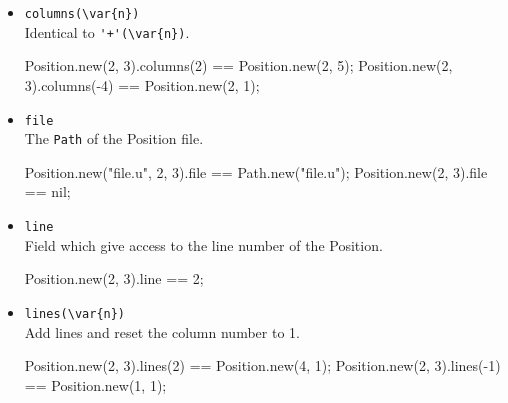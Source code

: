 \begin{itemize}
\item \lstinline|columns(\var{n})|\\
  Identical to \lstinline|'+'(\var{n})|.
\begin{urbiassert}[firstnumber=last]
Position.new(2, 3).columns(2) == Position.new(2, 5);
Position.new(2, 3).columns(-4) == Position.new(2, 1);
\end{urbiassert}

\item \lstinline|file|\\
  The \lstinline|Path| of the Position file.
\begin{urbiassert}[firstnumber=last]
Position.new("file.u", 2, 3).file == Path.new("file.u");
Position.new(2, 3).file == nil;
\end{urbiassert}

\item \lstinline|line|\\
  Field which give access to the line number of the Position.
\begin{urbiassert}[firstnumber=last]
Position.new(2, 3).line == 2;
\end{urbiassert}

\item \lstinline|lines(\var{n})|\\
  Add  lines and reset the column number to 1.
\begin{urbiassert}[firstnumber=last]
Position.new(2, 3).lines(2) == Position.new(4, 1);
Position.new(2, 3).lines(-1) == Position.new(1, 1);
\end{urbiassert}

\end{itemize}


